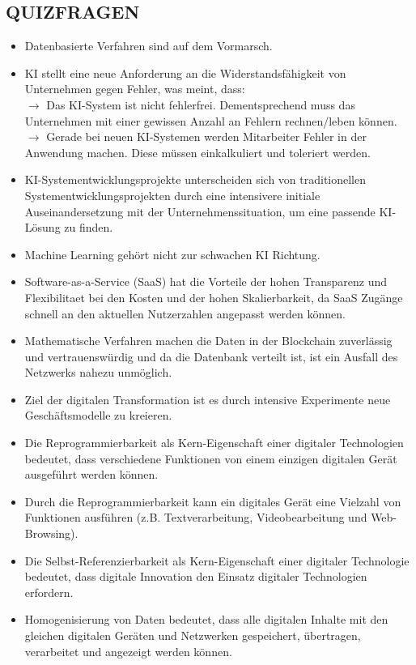 \documentclass[12pt,a4paper]{article}
\begin{document}
\newpage
\subsection{QUIZFRAGEN} %
\begin{itemize}
   \item Datenbasierte Verfahren sind auf dem Vormarsch.
   \item KI stellt eine neue Anforderung an die Widerstandsfähigkeit von Unternehmen gegen Fehler, was meint, dass:\\
         $\rightarrow$ Das KI-System ist nicht fehlerfrei. Dementsprechend muss das Unternehmen mit einer gewissen Anzahl an Fehlern rechnen/leben können.\\
         $\rightarrow$ Gerade bei neuen KI-Systemen werden Mitarbeiter Fehler in der Anwendung machen. Diese müssen einkalkuliert und toleriert werden.
   \item KI-Systementwicklungsprojekte unterscheiden sich von traditionellen Systementwicklungsprojekten durch eine intensivere initiale Auseinandersetzung mit der Unternehmenssituation, um eine passende KI-Lösung zu finden.
   \item Machine Learning gehört nicht zur schwachen KI Richtung.
   
   \item Software-as-a-Service (SaaS) hat die Vorteile der hohen Transparenz und Flexibilitaet bei den Kosten und der hohen Skalierbarkeit, da SaaS Zugänge schnell an den aktuellen Nutzerzahlen angepasst werden können.
   
   \item Mathematische Verfahren machen die Daten in der Blockchain zuverlässig und vertrauenswürdig und da die Datenbank verteilt ist, ist ein Ausfall des Netzwerks nahezu unmöglich.
   
   \item Ziel der digitalen Transformation ist es durch intensive Experimente neue Geschäftsmodelle zu kreieren.
   
   \item Die Reprogrammierbarkeit als Kern-Eigenschaft einer digitaler Technologien bedeutet, dass verschiedene Funktionen von einem einzigen digitalen Gerät ausgeführt werden können.
   \item Durch die Reprogrammierbarkeit kann ein digitales Gerät eine Vielzahl von Funktionen ausführen (z.B. Textverarbeitung, Videobearbeitung und Web-Browsing).
   \item Die Selbst-Referenzierbarkeit als Kern-Eigenschaft einer digitaler Technologie bedeutet, dass digitale Innovation den Einsatz digitaler Technologien erfordern.
   \item Homogenisierung von Daten bedeutet, dass alle digitalen Inhalte mit den gleichen digitalen Geräten und Netzwerken gespeichert, übertragen, verarbeitet und angezeigt werden können.
   

\end{itemize}
\end{document}

